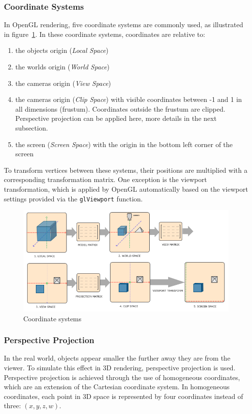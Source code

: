 \subsubsection{Coordinate Systems}\label{subsec:coordinate-systems}
In OpenGL rendering, five coordinate systems are commonly used, as illustrated in figure~\ref{fig:coordinate-systems}.
In these coordinate systems, coordinates are relative to:
\begin{enumerate}
    \item the objects origin (\textit{Local Space})
    \item the worlds origin (\textit{World Space})
    \item the cameras origin (\textit{View Space})
    \item the cameras origin (\textit{Clip Space}) with visible coordinates between -1 and 1 in all dimensions (frustum).
    Coordinates outside the frustum are clipped.
    Perspective projection can be applied here, more details in the next subsection.
    \item the screen (\textit{Screen Space})  with the origin in the bottom left corner of the screen
\end{enumerate}
To transform vertices between these systems, their positions are multiplied with a corresponding transformation matrix.
One exception is the viewport transformation,
which is applied by OpenGL automatically based on the viewport settings provided via the \texttt{glViewport} function.

\begin{figure}[h!]
    \centering
    \includegraphics[width=\linewidth]{images/coordinate_systems}
    \caption{Coordinate systems}
    \label{fig:coordinate-systems}
\end{figure}

\subsubsection{Perspective Projection}\label{sec:perspective-projection}
In the real world, objects appear smaller the further away they are from the viewer.
To simulate this effect in 3D rendering, perspective projection is used.
Perspective projection is achieved through the use of homogeneous coordinates,
which are an extension of the Cartesian coordinate system.
In homogeneous coordinates, each point in 3D space is represented by four coordinates instead of three: $(x, y, z, w)$.

